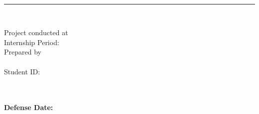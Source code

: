 \begin{titlepage}
{\begin{center}
{        %
        \begin{minipage}{0.8\linewidth}
            \centering
            {\large \textcolor{secondarycolor}{\reportsubtitle}}
        \end{minipage}\\[0.5cm]
        
        \textcolor{textcolor}{\rule{0.6\linewidth}{0.5mm}}\\[0.5cm]
        }

        {\large \textcolor{textcolor}{Project conducted at \textcolor{primarycolor}{\company}}}\\[0.2cm]
        {\large \textcolor{graycolor}{Internship Period: \internshipperiod}}\\[1cm]

        {\large \textcolor{textcolor}{Prepared by}}\\[0.3cm]
        {\large \textcolor{primarycolor}{\textbf{\reportauthor}}}\\[0.25cm]
        {\large \textcolor{graycolor}{Student ID: \studentid}}\\[0.25cm]
        {\large \textcolor{graycolor}{\program}}\\[1cm]
    \end{center}

    \vspace{1cm}

    \begin{center}
        \begin{minipage}{0.42\textwidth}
            \centering
            \companysupervisorinfo{\companytutor}{\tutorposition}
        \end{minipage}
        \hfill
        \begin{minipage}{0.42\textwidth}
            \centering
            \academicsupervisorinfo{\academicsupervisor}{\supervisorposition}
        \end{minipage}%
    \end{center}

    \vspace{1cm}

    \begin{center}
        \documentinfo{\academicyear}\\[0.3cm]
        {\large \textcolor{primarycolor}{\textbf{Defense Date: }}}
    \end{center}

    \vspace{1cm}

    } %

    \restoregeometry
\end{titlepage}